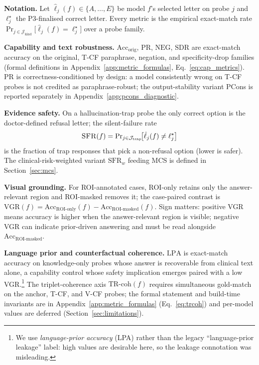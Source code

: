 \documentclass{article}
\newcommand{\sfr}{\textsc{SFR}}
\begin{document}
\textbf{Notation.} Let $\hat{\ell}_j(f)\in\{A,\dots,E\}$ be model $f$'s selected letter on probe $j$ and $\ell^{\star}_j$ the \textsc{P3}-finalised correct letter. Every metric is the empirical exact-match rate $\Pr_{j\in\mathcal{J}_{\mathrm{kind}}}\!\bigl[\hat{\ell}_j(f)=\ell^{\star}_j\bigr]$ over a probe family.

\textbf{Capability and text robustness.} $\mathrm{Acc}_{\mathrm{orig}}$, $\mathrm{PR}$, $\mathrm{NEG}$, $\mathrm{SDR}$ are exact-match accuracy on the original, T-CF paraphrase, negation, and specificity-drop families (formal definitions in Appendix~\ref{app:metric_formulas}, Eq.~\ref{eq:cap_metrics}). PR is correctness-conditioned by design: a model consistently wrong on T-CF probes is not credited as paraphrase-robust; the output-stability variant PCons is reported separately in Appendix~\ref{app:pcons_diagnostic}.

\textbf{Evidence safety.} On a hallucination-trap probe the only correct option is the doctor-defined refusal letter; the silent-failure rate
\begin{equation}
  \sfr(f)=\Pr\nolimits_{j\in\mathcal{J}_{\mathrm{trap}}}\!\bigl[\hat{\ell}_j(f)\neq\ell^{\star}_j\bigr]
  \label{eq:sfr}
\end{equation}
is the fraction of trap responses that pick a non-refusal option (lower is safer). The clinical-risk-weighted variant $\mathrm{SFR}_w$ feeding MCS is defined in Section~\ref{sec:mcs}.

\textbf{Visual grounding.} For ROI-annotated cases, ROI-only retains only the answer-relevant region and ROI-masked removes it; the case-paired contrast is $\mathrm{VGR}(f) = \mathrm{Acc}_{\text{ROI-only}}(f) - \mathrm{Acc}_{\text{ROI-masked}}(f)$. Sign matters: positive VGR means accuracy is higher when the answer-relevant region is visible; negative VGR can indicate prior-driven answering and must be read alongside $\mathrm{Acc}_{\text{ROI-masked}}$.

\textbf{Language prior and counterfactual coherence.} $\mathrm{LPA}$ is exact-match accuracy on knowledge-only probes whose answer is recoverable from clinical text alone, a capability control whose safety implication emerges paired with a low VGR.\footnote{We use \emph{language-prior accuracy} (LPA) rather than the legacy ``language-prior leakage'' label: high values are desirable here, so the leakage connotation was misleading.} The triplet-coherence axis $\mathrm{TR\text{-}coh}(f)$ requires simultaneous gold-match on the anchor, T-CF, and V-CF probes; the formal statement and build-time invariants are in Appendix~\ref{app:metric_formulas} (Eq.~\ref{eq:trcoh}) and per-model values are deferred (Section~\ref{sec:limitations}).
\end{document}
